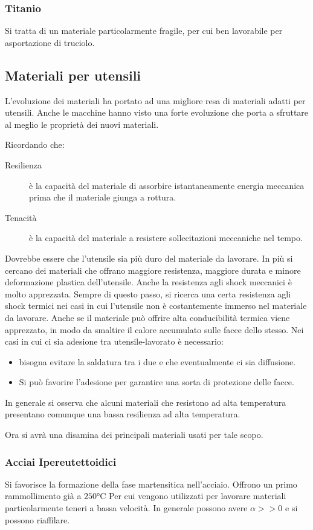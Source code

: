 \subsubsection{Titanio}
Si tratta di un materiale particolarmente fragile, per cui ben lavorabile per asportazione di truciolo.

\subsection{Materiali per utensili}
L'evoluzione dei materiali ha portato ad una migliore resa di materiali adatti per utensili. Anche le macchine hanno visto una forte evoluzione che porta a sfruttare al meglio le proprietà dei nuovi materiali.

Ricordando che:
\begin{description}
\item[Resilienza] è la capacità del materiale di assorbire istantaneamente energia meccanica prima che il materiale giunga a rottura.
\item[Tenacità] è la capacità del materiale a resistere sollecitazioni meccaniche nel tempo.
\end{description}
Dovrebbe essere che l'utensile sia più duro del materiale da lavorare.
In più si cercano dei materiali che offrano maggiore resistenza, maggiore durata e minore deformazione plastica dell'utensile.
Anche la resistenza agli shock meccanici è molto apprezzata.
Sempre di questo passo, si ricerca una certa resistenza agli shock termici nei casi in cui l'utensile non è costantemente immerso nel materiale da lavorare. Anche se il materiale può offrire alta conducibilità termica viene apprezzato, in modo da smaltire il calore accumulato sulle facce dello stesso.
Nei casi in cui ci sia adesione tra utensile-lavorato è necessario:
\begin{itemize}
\item bisogna evitare la saldatura tra i due e che eventualmente ci sia diffusione.
\item Si può favorire l'adesione per garantire una sorta di protezione delle facce.
\end{itemize}
In generale si osserva che alcuni materiali che resistono ad alta temperatura presentano comunque una bassa resilienza ad alta temperatura.

Ora si avrà una disamina dei principali materiali usati per tale scopo.

\subsubsection{Acciai Ipereutettoidici}
Si favorisce la formazione della fase martensitica nell'acciaio.
Offrono un primo rammollimento già a $250\unit{\celsius}$
Per cui vengono utilizzati per lavorare materiali particolarmente teneri a bassa velocità.
In generale possono avere $\alpha>>0$ e si possono riaffilare.
